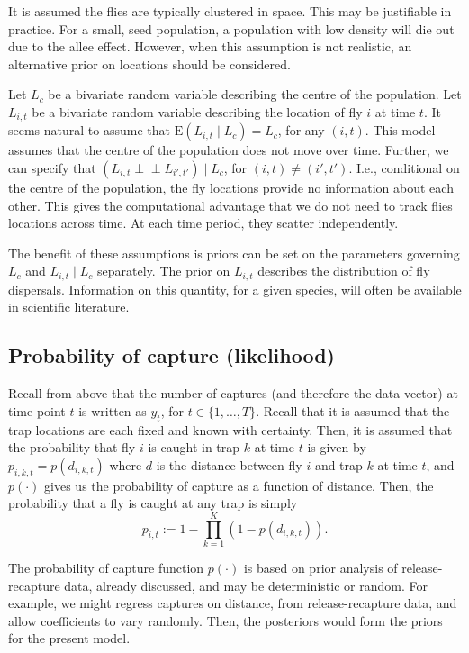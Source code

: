 \documentclass[
  oneside]{book}
\begin{document}
It is assumed the flies are typically clustered in space. This may be justifiable in practice. For a small, seed population, a population with low density will die out due to the allee effect. However, when this assumption is not realistic, an alternative prior on locations should be considered.

Let \(L_c\) be a bivariate random variable describing the centre of the population. Let \(L_{i, t}\) be a bivariate random variable describing the location of fly \(i\) at time \(t\). It seems natural to assume that \(\mathrm E (L_{i, t} \mid L_c) = L_c\), for any \((i, t)\). This model assumes that the centre of the population does not move over time. Further, we can specify that \((L_{i, t} \perp \!\!\! \perp L_{i', t'}) \mid L_c\), for \((i, t) \neq (i', t')\). I.e., conditional on the centre of the population, the fly locations provide no information about each other. This gives the computational advantage that we do not need to track flies locations across time. At each time period, they scatter independently.

The benefit of these assumptions is priors can be set on the parameters governing \(L_c\) and \(L_{i, t} \mid L_c\) separately. The prior on \(L_{i, t}\) describes the distribution of fly dispersals. Information on this quantity, for a given species, will often be available in scientific literature.

\hypertarget{probability-of-capture-likelihood}{%
\subsection{Probability of capture (likelihood)}\label{probability-of-capture-likelihood}}

Recall from above that the number of captures (and therefore the data vector) at time point \(t\) is written as \(y_t\), for \(t \in \{1, \ldots, T\}\). Recall that it is assumed that the trap locations are each fixed and known with certainty. Then, it is assumed that the probability that fly \(i\) is caught in trap \(k\) at time \(t\) is given by \(p_{i, k, t} = p(d_{i, k, t})\) where \(d\) is the distance between fly \(i\) and trap \(k\) at time \(t\), and \(p(\cdot)\) gives us the probability of capture as a function of distance. Then, the probability that a fly is caught at any trap is simply
\[
p_{i, t} := 1 - \prod_{k=1}^K(1 - p(d_{i, k, t})).
\]

The probability of capture function \(p(\cdot)\) is based on prior analysis of release-recapture data, already discussed, and may be deterministic or random. For example, we might regress captures on distance, from release-recapture data, and allow coefficients to vary randomly. Then, the posteriors would form the priors for the present model.
\end{document}
